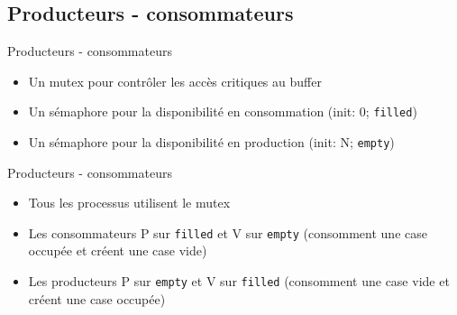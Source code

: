 \section{\sectitle}
\begin{frame}{\sectitle}
\def\subsectitle{Producteurs - consommateurs}
\subsection{\subsectitle}
\begin{block}{\subsectitle}
\begin{itemize}
    \item Un mutex pour contrôler les accès critiques au buffer
    \item Un sémaphore pour la disponibilité en consommation (init: 0;
    \texttt{filled})
    \item Un sémaphore pour la disponibilité en production (init: N;
    \texttt{empty})
\end{itemize}
\end{block}

\begin{alertblock}{\subsectitle}
\begin{itemize}
    \item Tous les processus utilisent le mutex
    \item Les consommateurs P sur \texttt{filled} et V sur \texttt{empty}
    (consomment une case occupée et créent une case vide)
    \item Les producteurs P sur \texttt{empty} et V sur \texttt{filled}
    (consomment une case vide et créent une case occupée)
\end{itemize}
\end{alertblock}
\end{frame}

\def\sectitle{Sémaphore}
